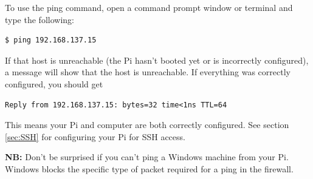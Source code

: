 To use the ping command, open a command prompt window or terminal and type the following:
\begin{lstlisting}
$ ping 192.168.137.15
\end{lstlisting}

If that host is unreachable (the Pi hasn't booted yet or is incorrectly configured), a message will show that the host is unreachable. If everything was correctly configured, you should get
\begin{lstlisting}
Reply from 192.168.137.15: bytes=32 time<1ns TTL=64
\end{lstlisting}

This means your Pi and computer are both correctly configured. See section \ref{sec:SSH} for configuring your Pi for SSH access.

\textbf{NB:} Don't be surprised if you can't ping a Windows machine from your Pi. Windows blocks the specific type of packet required for a ping in the firewall.